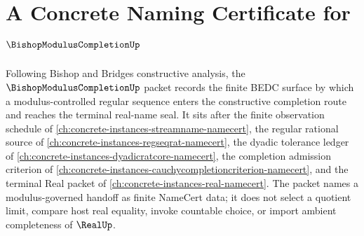 \chapter{A Concrete Naming Certificate for $\BishopModulusCompletionUp$}
\label{ch:concrete-instances-bishop-modulus-completion-namecert}

Following Bishop and Bridges constructive analysis, the $\BishopModulusCompletionUp$ packet records the finite BEDC surface by which a modulus-controlled regular sequence enters the constructive completion route and reaches the terminal real-name seal. It sits after the finite observation schedule of \autoref{ch:concrete-instances-streamname-namecert}, the regular rational source of \autoref{ch:concrete-instances-regseqrat-namecert}, the dyadic tolerance ledger of \autoref{ch:concrete-instances-dyadicratcore-namecert}, the completion admission criterion of \autoref{ch:concrete-instances-cauchycompletioncriterion-namecert}, and the terminal Real packet of \autoref{ch:concrete-instances-real-namecert}. The packet names a modulus-governed handoff as finite NameCert data; it does not select a quotient limit, compare host real equality, invoke countable choice, or import ambient completeness of $\RealUp$.

